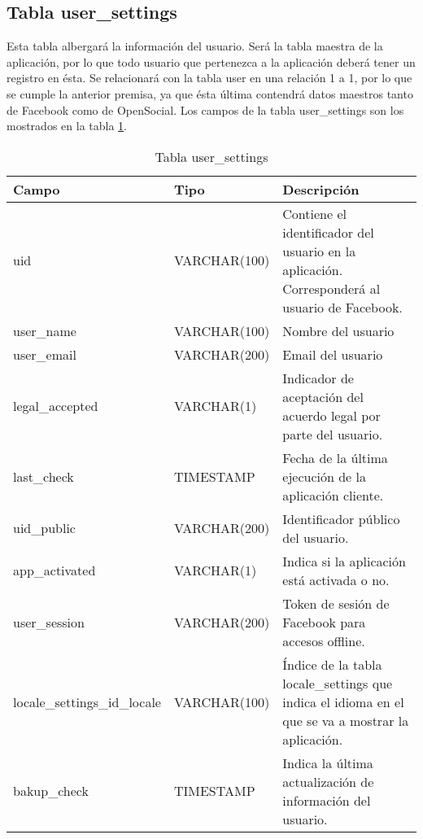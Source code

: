 \subsection{Tabla user\_settings}
Esta tabla albergará la información del usuario. Será la tabla maestra de la aplicación, por lo que todo usuario que pertenezca a la aplicación deberá tener un registro en ésta. Se relacionará con la tabla user en una relación 1 a 1, por lo que se cumple la anterior premisa, ya que ésta última contendrá datos maestros tanto de Facebook como de OpenSocial. Los campos de la tabla user\_settings son los mostrados en la tabla \ref{tabUserSettings}.
\begin{table}
\begin{center}

\begin{tabular}[c]{| l | l | p{60mm} |}\hline
\textbf{Campo}&\textbf{Tipo}&\textbf{Descripción} \\ \hline
uid & VARCHAR(100) & Contiene el identificador del usuario en la aplicación. Corresponderá al usuario de Facebook. \\ \hline
user\_name & VARCHAR(100) & Nombre del usuario \\ \hline
user\_email & VARCHAR(200) & Email del usuario \\ \hline
legal\_accepted & VARCHAR(1) & Indicador de aceptación del acuerdo legal por parte del usuario. \\ \hline
last\_check & TIMESTAMP & Fecha de la última ejecución de la aplicación cliente. \\ \hline
uid\_public & VARCHAR(200) & Identificador público del usuario. \\ \hline
app\_activated & VARCHAR(1) & Indica si la aplicación está activada o no. \\ \hline
user\_session & VARCHAR(200) & Token de sesión de Facebook para accesos offline. \\ \hline
locale\_settings\_id\_locale & VARCHAR(100) & Índice de la tabla locale\_settings que indica el idioma en el que se va a mostrar la aplicación. \\ \hline
bakup\_check & TIMESTAMP & Indica la última actualización de información del usuario. \\ \hline
\end{tabular}
\end{center}
\caption{Tabla user\_settings} \label{tabUserSettings}
\end{table}

